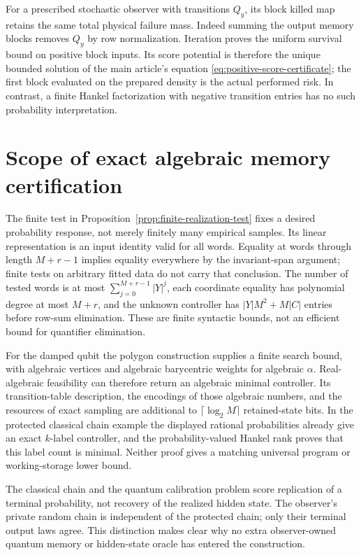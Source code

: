 For a prescribed stochastic observer with transitions $Q_y$, its block killed map retains the same total physical failure mass. Indeed summing the output memory blocks removes $Q_y$ by row normalization. Iteration proves the uniform survival bound on positive block inputs. Its score potential is therefore the unique bounded solution of the main article's equation \eqref{eq:positive-score-certificate}; the first block evaluated on the prepared density is the actual performed risk. In contrast, a finite Hankel factorization with negative transition entries has no such probability interpretation.

\section{Scope of exact algebraic memory certification}\label{sec:supp-realization-computation}
The finite test in Proposition~\ref{prop:finite-realization-test} fixes a desired probability response, not merely finitely many empirical samples. Its linear representation is an input identity valid for all words. Equality at words through length $M+r-1$ implies equality everywhere by the invariant-span argument; finite tests on arbitrary fitted data do not carry that conclusion. The number of tested words is at most $\sum_{j=0}^{M+r-1}|Y|^j$, each coordinate equality has polynomial degree at most $M+r$, and the unknown controller has $|Y|M^2+M|C|$ entries before row-sum elimination. These are finite syntactic bounds, not an efficient bound for quantifier elimination.

For the damped qubit the polygon construction supplies a finite search bound, with algebraic vertices and algebraic barycentric weights for algebraic $\alpha$. Real-algebraic feasibility can therefore return an algebraic minimal controller. Its transition-table description, the encodings of those algebraic numbers, and the resources of exact sampling are additional to $\lceil\log_2 M\rceil$ retained-state bits. In the protected classical chain example the displayed rational probabilities already give an exact $k$-label controller, and the probability-valued Hankel rank proves that this label count is minimal. Neither proof gives a matching universal program or working-storage lower bound.

The classical chain and the quantum calibration problem score replication of a terminal probability, not recovery of the realized hidden state. The observer's private random chain is independent of the protected chain; only their terminal output laws agree. This distinction makes clear why no extra observer-owned quantum memory or hidden-state oracle has entered the construction.

